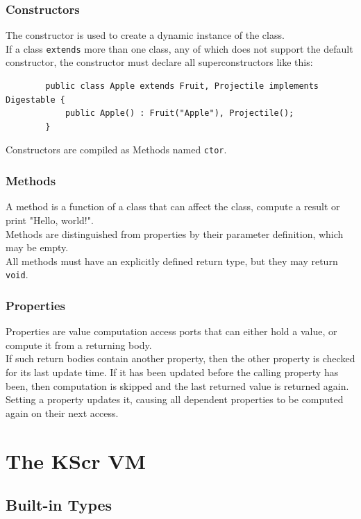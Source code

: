 \documentclass{docs}
\begin{document}
    \label{langCtor}
    \subsubsection{Constructors}
    The constructor is used to create a dynamic instance of the class. \\
    If a class \texttt{extends} more than one class, any of which does not support the default constructor, the constructor must declare all superconstructors like this:
    \begin{verbatim}
        public class Apple extends Fruit, Projectile implements Digestable {
            public Apple() : Fruit("Apple"), Projectile();
        }
    \end{verbatim}
    Constructors are compiled as Methods named \texttt{ctor}.
    
    \label{langMethod}
    \subsubsection{Methods}
    A method is a function of a class that can affect the class, compute a result or print "Hello, world!". \\
    Methods are distinguished from properties by their parameter definition, which may be empty. \\
    All methods must have an explicitly defined return type, but they may return \texttt{void}.
    
    \label{langProperty}
    \subsubsection{Properties}
    Properties are value computation access ports that can either hold a value, or compute it from a returning body. \\
    If such return bodies contain another property, then the other property is checked for its last update time. If it has been updated before the calling property has been, then computation is skipped and the last returned value is returned again.
    Setting a property updates it, causing all dependent properties to be computed again on their next access.
    
    \pagebreak
    \section{The KScr VM}

    \subsection{Built-in Types}
\end{document}
